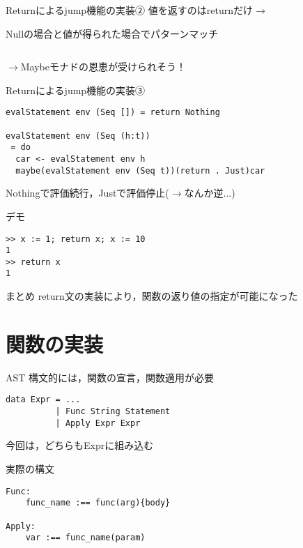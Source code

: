 \documentclass[uplatex,dvipdfmx,ja=standard]{beamer}
\begin{document}
\begin{frame}[fragile]{Returnによるjump機能の実装②}
値を返すのはreturnだけ$\to$

Nullの場合と値が得られた場合でパターンマッチ
\begin{verbatim}

\end{verbatim}

$\to$Maybeモナドの恩恵が受けられそう！

\end{frame}

\begin{frame}[fragile]{Returnによるjump機能の実装③}
    \begin{verbatim}
evalStatement env (Seq []) = return Nothing   

evalStatement env (Seq (h:t)) 
 = do 
  car <- evalStatement env h
  maybe(evalStatement env (Seq t))(return . Just)car
    \end{verbatim}
    Nothingで評価続行，Justで評価停止($\to$なんか逆...)
\end{frame}


\begin{frame}[fragile]{デモ}
    \begin{verbatim}
>> x := 1; return x; x := 10
1
>> return x
1
    \end{verbatim}

\end{frame}

\begin{frame}{まとめ}
return文の実装により，関数の返り値の指定が可能になった
\end{frame}


\section{関数の実装}

\begin{frame}[fragile]{AST}
    構文的には，関数の宣言，関数適用が必要

    \begin{verbatim}
data Expr = ...
          | Func String Statement
          | Apply Expr Expr     
    \end{verbatim}
今回は，どちらもExprに組み込む
\end{frame}


\begin{frame}[fragile]{実際の構文}
    \begin{verbatim}
Func:
    func_name :== func(arg){body}

Apply:
    var :== func_name(param) 
\end{verbatim}

\end{frame}
\end{document}
